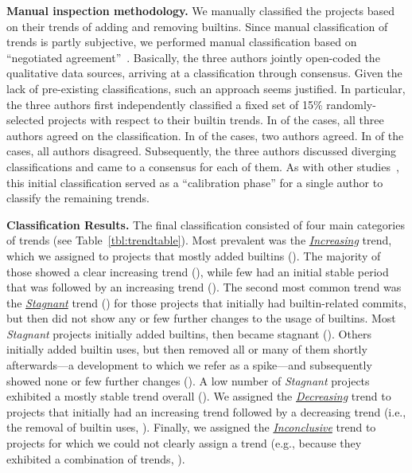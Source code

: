\documentclass[sigconf,screen]{acmart}
\renewcommand{\paragraph}[1]{\textbf{#1}}
\begin{document}
\paragraph{Manual inspection methodology.}
We manually classified the \nrnotautomatic{} projects based on their trends of adding and removing builtins.
Since manual classification of trends is partly subjective,
we performed manual classification based on ``negotiated agreement''~\cite{Parnin2017,campbell13}.
Basically, the three authors jointly open-coded the qualitative data sources, arriving at a classification through consensus. Given the lack of pre-existing classifications, such an approach seems justified. In particular, the three authors first independently classified a fixed set of 15\% randomly-selected projects with respect to their builtin trends.
In \classificationsNrAgreed{} of the cases, all three authors agreed on the classification.
In \classificationsNrTwoAgreed{} of the cases, two authors agreed.
In \classificationsAllDisagreed{} of the cases, all authors disagreed.
Subsequently, the three authors discussed diverging classifications and came to a consensus for each of them.
As with other studies~\cite{15-percent,10-15-percent}, this initial classification served as a ``calibration phase'' for a single author to classify the remaining trends.



\paragraph{Classification Results.}
The final classification consisted of four main categories of trends (see Table~\ref{tbl:trendtable}).
Most prevalent was the \underline{\emph{Increasing}} trend, which we assigned to projects that mostly added builtins (\percentageincreasing{}).
The majority of those showed a clear increasing trend (\percentagemostlyincreasing{}), while few had an initial stable period that was followed by an increasing trend (\percentagestablethenincreasing{}).
The second most common trend was the \underline{\emph{Stagnant}} trend (\percentagestagnant{}) for those projects that initially had builtin-related commits, but then did not show any or few further changes to the usage of builtins.
Most \emph{Stagnant} projects initially added builtins, then became stagnant (\percentageincreasingthenstable{}).
Others initially added builtin uses, but then removed all or many of them shortly afterwards---a development to which we refer as a spike---and subsequently showed none or few further changes (\percentagespikethenstable{}).
A low number of \emph{Stagnant} projects exhibited a mostly stable trend overall (\percentagemostlystable{}).
We assigned the \underline{\emph{Decreasing}} trend to projects that initially had an increasing trend followed by a decreasing trend (i.e., the removal of builtin uses, \percentageincreasingthendecreasing{}).
Finally, we assigned the \underline{\emph{Inconclusive}} trend to projects for which we could not clearly assign a trend (e.g., because they exhibited a combination of trends, \percentagenoclearpattern{}).
\end{document}
